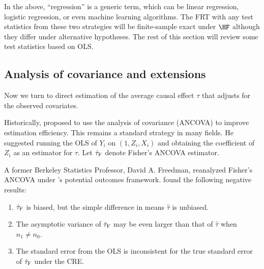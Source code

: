 In the above,  ``regression'' is a generic term, which can be linear regression, logistic regression, or even machine learning algorithms. The FRT with any test statistics from these two strategies will be finite-sample exact under $\HF$ although they differ under alternative hypotheses. 
The rest of this section will review some test statistics based on OLS. 



\subsection{Analysis of covariance and extensions}\label{sec::ancova}

Now we turn to direct estimation of the average causal effect $\tau$ that adjusts for the observed covariates. 

Historically, \citet{fisher1925statistical} proposed to use the analysis of covariance (ANCOVA) to improve estimation efficiency. This remains a standard strategy in many fields. He suggested running the OLS of $Y_i$ on $(1, Z_i, X_i)$ and obtaining the coefficient of $Z_i$ as an estimator for $\tau$. Let $\hat{\tau}_\textsc{F}$ denote Fisher's ANCOVA estimator. 


A former Berkeley Statistics Professor, David A. Freedman, reanalyzed Fisher's ANCOVA under \citet{Neyman:1923}'s potential outcomes framework. \citet{freedman2008regression_a, freedman2008regression_b} found the following negative results:
\begin{enumerate}
[(1)]
\item
$\hat{\tau}_\textsc{F}$ is biased, but the simple difference in means $\hat{\tau}$ is unbiased.
\item 
The asymptotic variance of $\hat{\tau}_\textsc{F}$ may be even larger than that of $\hat{\tau}$ when $n_1\neq n_0$.
\item 
The standard error from the OLS is inconsistent for the true standard error of $\hat{\tau}_\textsc{F}$ under the CRE.   
\end{enumerate}


